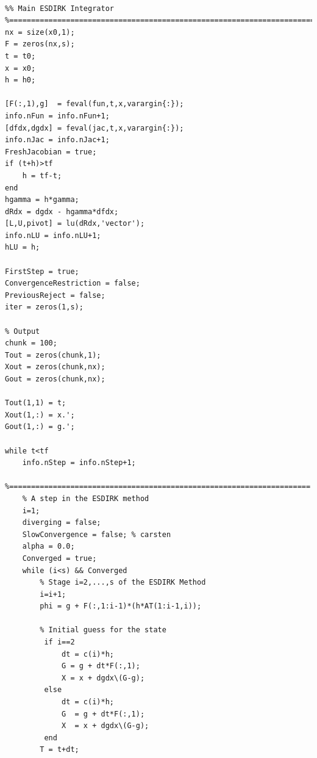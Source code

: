 \begin{lstlisting}[caption = ESDIRK23 method with adaptive time step size, captionpos=b, label=8_ESDIRK23_adaptive]
        
%% Main ESDIRK Integrator
%========================================================================
nx = size(x0,1);
F = zeros(nx,s);
t = t0;
x = x0;
h = h0;

[F(:,1),g]  = feval(fun,t,x,varargin{:});
info.nFun = info.nFun+1;
[dfdx,dgdx] = feval(jac,t,x,varargin{:});
info.nJac = info.nJac+1;
FreshJacobian = true;
if (t+h)>tf
    h = tf-t;
end
hgamma = h*gamma;
dRdx = dgdx - hgamma*dfdx;
[L,U,pivot] = lu(dRdx,'vector');
info.nLU = info.nLU+1;
hLU = h;

FirstStep = true;
ConvergenceRestriction = false;
PreviousReject = false;
iter = zeros(1,s);

% Output
chunk = 100;
Tout = zeros(chunk,1);
Xout = zeros(chunk,nx);
Gout = zeros(chunk,nx); 

Tout(1,1) = t;
Xout(1,:) = x.';
Gout(1,:) = g.';

while t<tf
    info.nStep = info.nStep+1;
    %=====================================================================
    % A step in the ESDIRK method
    i=1;   
    diverging = false;
    SlowConvergence = false; % carsten
    alpha = 0.0;
    Converged = true;
    while (i<s) && Converged
        % Stage i=2,...,s of the ESDIRK Method
        i=i+1;
        phi = g + F(:,1:i-1)*(h*AT(1:i-1,i));

        % Initial guess for the state
         if i==2
             dt = c(i)*h;
             G = g + dt*F(:,1);
             X = x + dgdx\(G-g);
         else
             dt = c(i)*h;
             G  = g + dt*F(:,1);
             X  = x + dgdx\(G-g);
         end
        T = t+dt;
            

\end{lstlisting}
